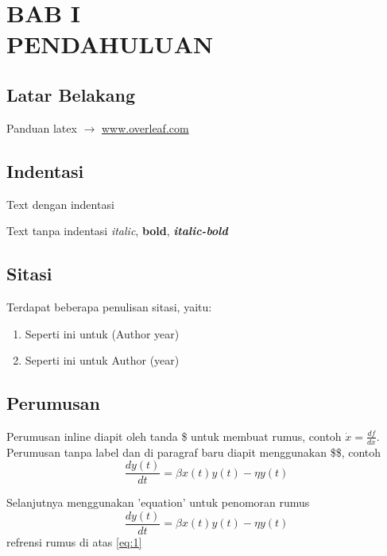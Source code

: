 \chapter*{
  BAB I\\
  \vspace{-10pt}
  PENDAHULUAN
 }


\section{Latar Belakang}
Panduan latex $\rightarrow$ \href{https://www.overleaf.com/learn/latex/Learn_LaTeX_in_30_minutes}{www.overleaf.com}
\section{Indentasi}
Text dengan indentasi \lipsum[1][1-3]

\noindent Text tanpa indentasi \lipsum[1][1-3]
\textit{italic}, \textbf{bold}, \textbf{\textit{italic-bold}}

\section{Sitasi}
\noindent Terdapat beberapa penulisan sitasi, yaitu:
\begin{enumerate}
    \item Seperti ini \parencite{Luschi2013} untuk (Author year)
    \item Seperti ini \textcite{Luschi2013} untuk Author (year)
\end{enumerate}


\section{Perumusan}
\noindent Perumusan inline diapit oleh tanda \$ untuk membuat rumus, contoh $\dot{x}=\frac{df}{dx}$.
\noindent Perumusan tanpa label dan di paragraf baru diapit menggunakan \$\$, contoh
$$
    \frac{dy(t)}{dt} = \beta x(t)y(t) - \eta y(t)
$$

\noindent Selanjutnya menggunakan 'equation' untuk penomoran rumus
\begin{equation}\label{eq:1}
    \frac{dy(t)}{dt} = \beta x(t)y(t) - \eta y(t)
\end{equation}
\noindent refrensi rumus di atas \eqref{eq:1}

